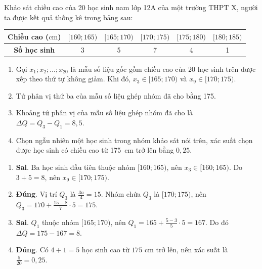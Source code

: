 \begin{baitap}
	Khảo sát chiều cao của 20 học sinh nam lớp 12A của một trường THPT X, người ta được kết quả thống kê trong bảng sau:
	\begin{center}
		\begin{tabular}{|c|c|c|c|c|c|}
			\hline
			\textbf{Chiều cao ($\mathrm{cm}$)} & $[160; 165)$ & $[165; 170)$ & $[170; 175)$ & $[175; 180)$ & $[180; 185)$ \\
			\hline
			\textbf{Số học sinh} & 3 & 5 & 7 & 4 & 1 \\
			\hline
		\end{tabular}
	\end{center}
	\begin{enumerate}
		\item Gọi $x_1; x_2; \ldots; x_{20}$ là mẫu số liệu gốc gồm chiều cao của 20 học sinh trên được xếp theo thứ tự không giảm. Khi đó, $x_3 \in [165; 170)$ và $x_9 \in [170; 175)$.
		\item Tứ phân vị thứ ba của mẫu số liệu ghép nhóm đã cho bằng 175.
		\item Khoảng tứ phân vị của mẫu số liệu ghép nhóm đã cho là $\Delta Q = Q_3 - Q_1 = 8{,}5$.
		\item Chọn ngẫu nhiên một học sinh trong nhóm khảo sát nói trên, xác suất chọn được học sinh có chiều cao từ \qty{175}{\centi\meter} trở lên bằng $0{,}25$.
	\end{enumerate}
	\begin{traloi}
		
		\begin{enumerate}
			\item \textbf{Sai}. Ba học sinh đầu tiên thuộc nhóm \([160;165)\), nên \(x_3\in[160;165)\). Do \(3+5=8\), nên \(x_9\in[170;175)\).
			
			\item \textbf{Đúng}. Vị trí \(Q_3\) là \(\frac{3n}{4}=15\). Nhóm chứa \(Q_3\) là \([170;175)\), nên \(Q_3=170+\frac{15-8}{7}\cdot5=175\).
			
			\item \textbf{Sai}. \(Q_1\) thuộc nhóm \([165;170)\), nên \(Q_1=165+\frac{5-3}{5}\cdot5=167\). Do đó \(\Delta Q=175-167=8\).
			
			\item \textbf{Đúng}. Có \(4+1=5\) học sinh cao từ \(175\) cm trở lên, nên xác suất là \(\frac{5}{20}=0{,}25\).
		\end{enumerate}
	\end{traloi}
\end{baitap}

